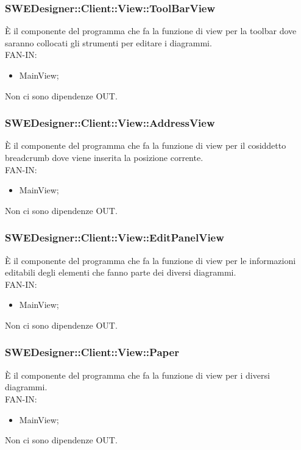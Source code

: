 \documentclass[../PianoDiQualifica.tex]{subfiles}
\begin{document}
		\subsubsection{SWEDesigner::Client::View::ToolBarView}
		È il componente del programma che fa la funzione di view per la toolbar dove saranno collocati gli strumenti per editare i diagrammi.\\
		FAN-IN:
		\begin{itemize}
			\item MainView;
		\end{itemize}
		Non ci sono dipendenze OUT.
		\subsubsection{SWEDesigner::Client::View::AddressView}
		È il componente del programma che fa la funzione di view per il cosiddetto breadcrumb dove viene inserita la posizione corrente.\\
		FAN-IN:
		\begin{itemize}
			\item MainView;
		\end{itemize}
		Non ci sono dipendenze OUT.
		\subsubsection{SWEDesigner::Client::View::EditPanelView}
		È il componente del programma che fa la funzione di view per le informazioni editabili degli elementi che fanno parte dei diversi diagrammi.\\
		FAN-IN:
		\begin{itemize}
			\item MainView;
		\end{itemize}
		Non ci sono dipendenze OUT.
		\subsubsection{SWEDesigner::Client::View::Paper}
		È il componente del programma che fa la funzione di view per i diversi diagrammi.\\
		FAN-IN:
		\begin{itemize}
			\item MainView;
		\end{itemize}
		Non ci sono dipendenze OUT.
\end{document}
